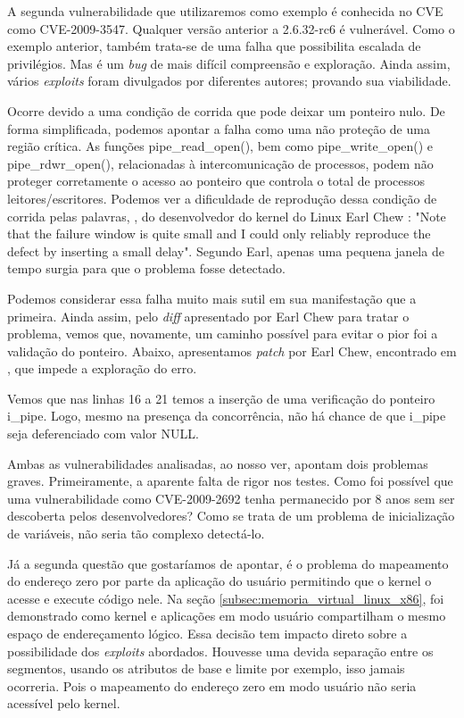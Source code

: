			
			A segunda vulnerabilidade que utilizaremos como exemplo é conhecida no CVE como CVE-2009-3547.
			Qualquer versão anterior a 2.6.32-rc6 é vulnerável.
			Como o exemplo anterior, também trata-se de uma falha que possibilita escalada de privilégios.
			Mas é um \textsl{bug} de mais difícil compreensão e exploração. Ainda assim, vários \textsl{exploits}
			foram divulgados por diferentes autores; provando sua viabilidade.

			
			Ocorre devido a uma condição de corrida que pode deixar	um ponteiro nulo. De forma simplificada,
			podemos apontar a falha como uma não proteção de uma região crítica. As funções
			pipe\_read\_open(), bem como pipe\_write\_open() e pipe\_rdwr\_open(), relacionadas à intercomunicação
			de processos, podem não proteger corretamente o acesso ao ponteiro que controla o total de
			processos leitores/escritores. Podemos ver a dificuldade de reprodução dessa condição de corrida pelas
			palavras, \cite{git_kernel_org_cve2009_3547}, do desenvolvedor do kernel do Linux Earl Chew :
			"Note that the failure window is quite small and I could only
			reliably reproduce the defect by inserting a small delay".
			Segundo Earl, apenas uma pequena janela de tempo surgia para que o problema fosse detectado.
			
	
			Podemos considerar essa falha muito mais sutil em sua manifestação que a primeira.
			Ainda assim, pelo \textsl{diff} apresentado por Earl Chew para tratar o problema,
			vemos que, novamente, um caminho possível para evitar o pior foi a validação do ponteiro.
			Abaixo, apresentamos \textsl{patch} por Earl Chew, encontrado em \cite{git_kernel_org_cve2009_3547}, 
			que impede a exploração do erro.
			
			Vemos que nas linhas 16 a 21 temos a inserção de uma verificação do ponteiro i\_pipe.
			Logo, mesmo na presença da concorrência, não há chance de que i\_pipe seja deferenciado com valor NULL.
			
			
			Ambas as vulnerabilidades analisadas, ao nosso ver, apontam dois problemas graves.
			Primeiramente, a aparente falta de rigor nos testes. Como foi possível
			que uma vulnerabilidade como CVE-2009-2692 tenha permanecido por 8 anos sem ser descoberta
			pelos desenvolvedores? Como se trata de um problema de inicialização de variáveis,
			não seria tão complexo detectá-lo.
			
			
			Já a segunda questão que gostaríamos de apontar, é o problema do mapeamento do endereço
			zero por parte da aplicação do usuário permitindo que o kernel o acesse e execute
			código nele. Na seção \ref{subsec:memoria_virtual_linux_x86}, foi demonstrado como
			kernel e aplicações em modo usuário compartilham o mesmo espaço de endereçamento lógico.
			Essa decisão tem impacto direto sobre a possibilidade dos \textsl{exploits} abordados.
			Houvesse uma devida separação entre os segmentos, usando
			os atributos de base e limite por exemplo, isso jamais ocorreria. Pois o mapeamento
			do endereço zero em modo usuário não seria acessível pelo kernel.
			

